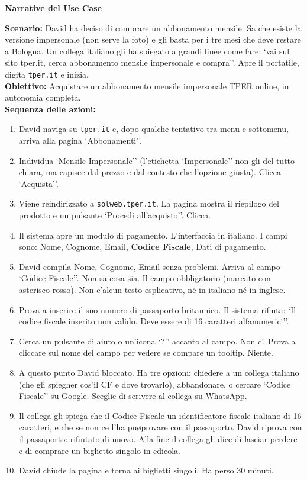 \documentclass[11pt,a4paper]{article}
\begin{document}
\begin{tcolorbox}[colback=backgroundColor,colframe=borderColor,arc=2mm]
    \textbf{Narrative del Use Case} \\[4pt]
    {\small
    \textbf{Scenario:} David ha deciso di comprare un abbonamento mensile. Sa che esiste la versione impersonale (non serve la foto) e gli basta per i tre mesi che deve restare a Bologna. Un collega italiano gli ha spiegato a grandi linee come fare: `vai sul sito tper.it, cerca abbonamento mensile impersonale e compra''. Apre il portatile, digita \texttt{tper.it} e inizia. \\[4pt]

    \textbf{Obiettivo:} Acquistare un abbonamento mensile impersonale TPER online, in autonomia completa. \\[4pt]

    \textbf{Sequenza delle azioni:}
    \begin{enumerate}
        \item David naviga su \texttt{tper.it} e, dopo qualche tentativo tra menu e sottomenu, arriva alla pagina `Abbonamenti''.
        \item Individua `Mensile Impersonale'' (l'etichetta `Impersonale'' non gli \e del tutto chiara, ma capisce dal prezzo e dal contesto che \e l'opzione giusta). Clicca `Acquista''.
        \item Viene reindirizzato a \texttt{solweb.tper.it}. La pagina mostra il riepilogo del prodotto e un pulsante `Procedi all'acquisto''. Clicca.
        \item Il sistema apre un modulo di pagamento. L'interfaccia \e in italiano. I campi sono: Nome, Cognome, Email, \textbf{Codice Fiscale}, Dati di pagamento.
        \item David compila Nome, Cognome, Email senza problemi. Arriva al campo `Codice Fiscale''. Non sa cosa sia. Il campo \e obbligatorio (marcato con asterisco rosso). Non c'\e alcun testo esplicativo, n\'e in italiano n\'e in inglese.
        \item Prova a inserire il suo numero di passaporto britannico. Il sistema rifiuta: `Il codice fiscale inserito non \e valido. Deve essere di 16 caratteri alfanumerici''.
        \item Cerca un pulsante di aiuto o un'icona `?'' accanto al campo. Non c'\e. Prova a cliccare sul nome del campo per vedere se compare un tooltip. Niente.
        \item A questo punto David \e bloccato. Ha tre opzioni: chiedere a un collega italiano (che gli spiegher\ cos'\e il CF e dove trovarlo), abbandonare, o cercare `Codice Fiscale'' su Google. Sceglie di scrivere al collega su WhatsApp.
        \item Il collega gli spiega che il Codice Fiscale \e un identificatore fiscale italiano di 16 caratteri, e che se non ce l'ha pu\o provare con il passaporto. David riprova con il passaporto: rifiutato di nuovo. Alla fine il collega gli dice di lasciar perdere e di comprare un biglietto singolo in edicola.
        \item David chiude la pagina e torna ai biglietti singoli. Ha perso 30 minuti.
    \end{enumerate}

}
\end{tcolorbox}
\end{document}
